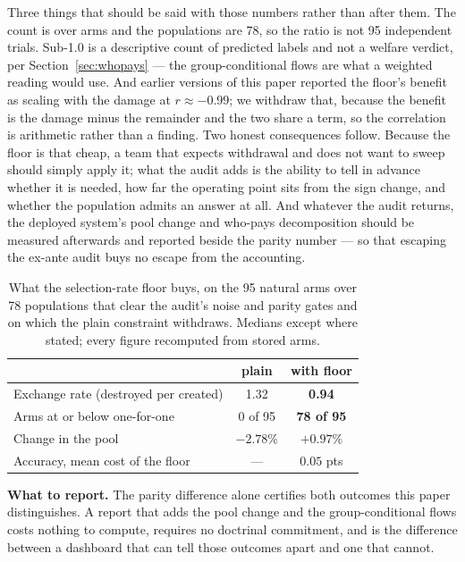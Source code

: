 \documentclass[conference]{IEEEtran}
\begin{document}
Three things that should be said with those numbers rather than after them. The count is over arms and the populations are 78, so the ratio is not 95 independent trials. Sub-1.0 is a
descriptive count of predicted labels and not a welfare verdict, per Section~\ref{sec:whopays}
--- the group-conditional flows are what a weighted reading would use. And earlier versions of
this paper reported the floor's benefit as scaling with the damage at $r \approx -0.99$; we
withdraw that, because the benefit is the damage minus the remainder and the two share a term,
so the correlation is arithmetic rather than a finding. Two honest consequences follow. Because the floor is that
cheap, a team that expects withdrawal and does not want to sweep should simply apply it; what
the audit adds is the ability to tell in advance whether it is needed, how far the operating
point sits from the sign change, and whether the population admits an answer at all. And
whatever the audit returns, the deployed system's pool change and who-pays decomposition
should be measured afterwards and reported beside the parity number --- so that escaping the
ex-ante audit buys no escape from the accounting.

\begin{table}[!t]
\caption{What the selection-rate floor buys, on the 95 natural arms over 78 populations that
clear the audit's noise and parity gates and on which the plain constraint withdraws.
Medians except where stated; every figure recomputed from stored arms.}
\label{tab:floor}
\centering
\small
\begin{tabular}{@{}lcc@{}}
\toprule
& \textbf{plain} & \textbf{with floor} \\
\midrule
Exchange rate (destroyed per created) & 1.32 & \textbf{0.94} \\
Arms at or below one-for-one & 0 of 95 & \textbf{78 of 95} \\
Change in the pool & $-2.78\%$ & $\mathbf{+0.97\%}$ \\
Accuracy, mean cost of the floor & --- & $0.05$ pts \\
\bottomrule
\end{tabular}
\end{table}

\textbf{What to report.} The parity difference alone certifies both outcomes this paper
distinguishes. A report that adds the pool change and the group-conditional flows costs
nothing to compute, requires no doctrinal commitment, and is the difference between a
dashboard that can tell those outcomes apart and one that cannot.
\end{document}
